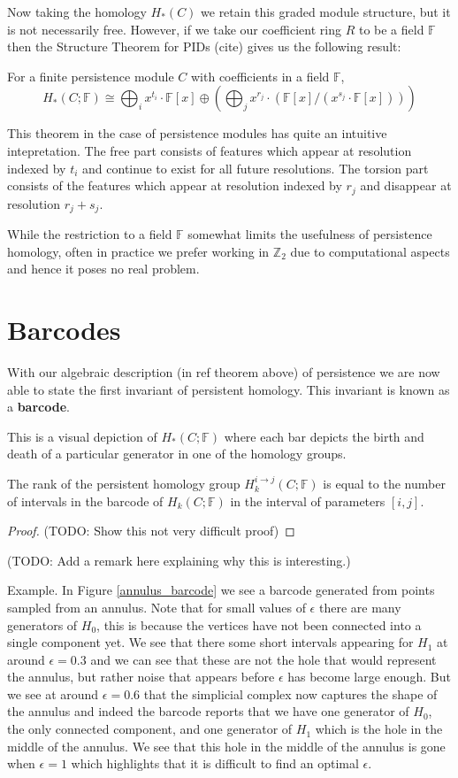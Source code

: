 Now taking the homology $H_{*}(C)$ we retain this graded module structure, but it is not necessarily free. However, if we take our coefficient ring $R$ to be a field $\mathbb{F}$ then the Structure Theorem for PIDs (cite) gives us the following result:
\begin{theorem}
  For a finite persistence module $C$ with coefficients in a field $\mathbb{F}$,
  \[H_{*}(C;\mathbb{F}) \cong \bigoplus_{i} x^{t_{i}} \cdot \mathbb{F}[x] \oplus (\bigoplus_{j} x^{r_{j}} \cdot (\mathbb{F}[x]/(x^{s_{j}} \cdot \mathbb{F}[x]))) \]
\end{theorem}
This theorem in the case of persistence modules has quite an intuitive intepretation. The free part consists of features which appear at resolution indexed by $t_{i}$ and continue to exist for all future resolutions. The torsion part consists of the features which appear at resolution indexed by $r_{j}$ and disappear at resolution $r_{j}+s_{j}$.

While the restriction to a field $\mathbb{F}$ somewhat limits the usefulness of persistence homology, often in practice we prefer working in $\mathbb{Z}_{2}$ due to computational aspects and hence it poses no real problem.
\section{Barcodes}
With our algebraic description (in ref theorem above) of persistence we are now able to state the first invariant of persistent homology. This invariant is known as a \textbf{barcode}.

This is a visual depiction of $H_{*}(C; \mathbb{F})$ where each bar depicts the birth and death of a particular generator in one of the homology groups.

\begin{theorem}
  The rank of the persistent homology group $H^{{i \to j}}_{k}(C;\mathbb{F})$ is equal to the number of intervals in the barcode of $H_{k}(C;\mathbb{F})$ in the interval of parameters $[i,j]$.
  \end{theorem}
  \begin{proof}
  (TODO: Show this not very difficult proof)
  \end{proof}
  (TODO: Add a remark here explaining why this is interesting.)

  Example. In Figure \ref{annulus_barcode} we see a barcode generated from points sampled from an annulus. Note that for small values of $\epsilon$ there are many generators of $H_{0}$, this is because the vertices have not been connected into a single component yet. We see that there some short intervals appearing for $H_{1}$ at around $\epsilon=0.3$ and we can see that these are not the hole that would represent the annulus, but rather noise that appears before $\epsilon$ has become large enough. But we see at around $\epsilon=0.6$ that the simplicial complex now captures the shape of the annulus and indeed the barcode reports that we have one generator of $H_{0}$, the only connected component, and one generator of $H_{1}$ which is the hole in the middle of the annulus. We see that this hole in the middle of the annulus is gone when $\epsilon=1$ which highlights that it is difficult to find an optimal $\epsilon$.

